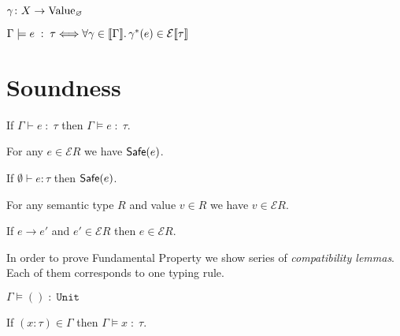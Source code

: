 $\gamma \colon X \to \mathrm{Value}_{\varnothing}$

$\Gamma \models e \;:\; \tau \Longleftrightarrow
  \forall \gamma \in \llbracket\Gamma\rrbracket\ldotp
  \gamma^*(e) \in \mathcal{E}\llbracket\tau\rrbracket$

\section{Soundness}

\begin{theorem}
  If $\Gamma \vdash e \;:\; \tau$ then $\Gamma \models e \;:\; \tau$.
\end{theorem}

\begin{theorem}[Adequacy]
  For any $e \in \mathcal{E}R$ we have $\mathsf{Safe}(e)$.
\end{theorem}

\begin{theorem}
  If $\emptyset \vdash e : \tau$ then $\mathsf{Safe}(e)$.
\end{theorem}

\begin{lemma}\label{lem:lr-val-in-eclo}
  For any semantic type $R$ and value $v \in R$
  we have $v \in \mathcal{E}R$.
\end{lemma}

\begin{lemma}\label{lem:lr-eclo-red}
  If $e \longrightarrow e'$ and $e' \in \mathcal{E}R$ then $e \in \mathcal{E}R$.
\end{lemma}

In order to prove Fundamental Property
we show series of \emph{compatibility lemmas}.
Each of them corresponds to one typing rule.

\begin{lemma}
  $\Gamma \models () \;:\; \mathtt{Unit}$
\end{lemma}

\begin{lemma}
  If $(x:\tau) \in \Gamma$ then
  $\Gamma \models x \;:\; \tau$.
\end{lemma}

